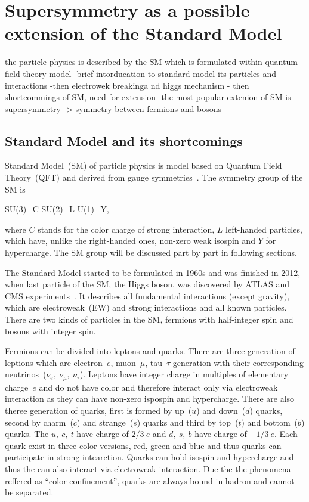 \chapter{Supersymmetry as a possible extension of the Standard Model}

the particle physics is described by the SM which is formulated within quantum field theory model
-brief intorducation to standard model its particles and interactions
-then electrowek breakinga nd higgs mechanism
- then shortcommings of SM, need for extension
-the most popular extenion of SM is supersymmetry -> symmetry between fermions and bosons

\section{Standard Model and its shortcomings}

Standard Model~(SM) of particle physics is model based on Quantum Field Theory~(QFT) and derived from gauge symmetries~\cite{9783527406012}. The symmetry group of the SM is

{
SU(3)_{C} \otimes SU(2)_{L} \otimes U(1)_{Y},
}

where $C$ stands for the color charge of strong interaction, $L$ left-handed particles, which have, unlike the right-handed ones, non-zero weak isospin and $Y$ for hypercharge. The SM group will be discussed part by part in following sections.

The Standard Model started to be formulated in 1960s and was finished in 2012, when last particle of the SM, the Higgs boson, was discovered by ATLAS and CMS experiments~\cite{Chatrchyan:2012xdj, Aad:2012tfa}. It describes all fundamental interactions (except gravity), which are electroweak~(EW) and strong interactions and all known particles. There are two kinds of particles in the SM, fermions with half-integer spin and bosons with integer spin.

Fermions can be divided into leptons and quarks. There are three generation of leptions which are electron~$e$, muon~$\mu$, tau~$\tau$ generation with their corresponding neutrinos~($\nu_{e},~\nu_{\mu},~\nu_{\tau}$). Leptons have integer charge in multiples of elementary charge~$e$ and do not have color and therefore interact only via electroweak interaction as they can have non-zero ispospin and hypercharge. There are also theree generation of quarks, first is formed by up~($u$) and down~($d$) quarks, second by charm~($c$) and strange~($s$) quarks and third by top~($t$) and bottom~($b$) quarks. The $u,~c,~t$ have charge of $2/3~e$ and $d,~s,~b$ have charge of $-1/3~e$. Each quark exist in three color versions, red, green and blue and thus quarks can participate in strong intearction. Quarks can hold isospin and hypercharge and thus the can also interact via electroweak interaction. Due the the phenomena reffered as ``color confinement'', quarks are always bound in hadron and cannot be separated.

